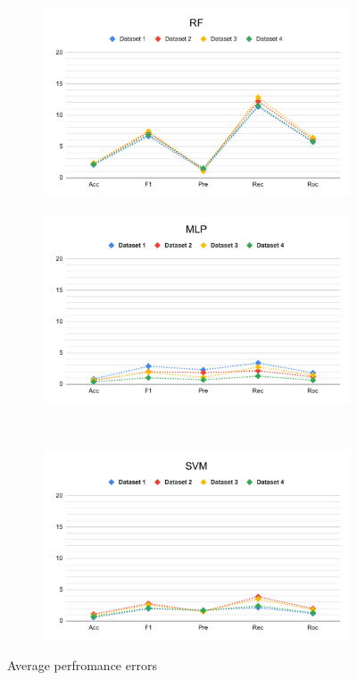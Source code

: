\begin{figure}[H]
\begin{subfigure}{.5\columnwidth}
    \includegraphics[width=0.9\columnwidth]{media/data/performance_delta/delta_RF.pdf}
    \caption{}
    \label{fig:perfromance_delta_rf}
  \end{subfigure}%
  \begin{subfigure}{.5\columnwidth}
    \centering
    \includegraphics[width=0.9\columnwidth]{media/data/performance_delta/delta_MLP.pdf}
    \caption{}
    \label{fig:perfromance_delta_mlp}
  \end{subfigure}\\%
  \begin{subfigure}{.5\columnwidth}
    \centering
    \includegraphics[width=0.9\columnwidth]{media/data/performance_delta/delta_SVM.pdf}
    \caption{}
    \label{fig:perfromance_delta_svm}
  \end{subfigure}
  \caption{Average perfromance errors}
  \label{fig:perfromance_delta}
\end{figure}

